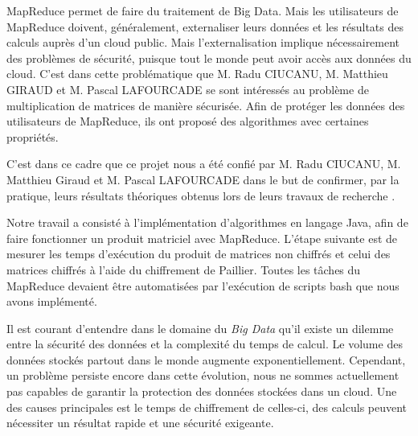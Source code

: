 

MapReduce permet de faire du traitement de Big Data.
Mais les utilisateurs de MapReduce doivent, généralement, externaliser leurs données et les résultats des calculs auprès
d'un cloud public. Mais l'externalisation implique nécessairement des problèmes de sécurité, puisque tout le monde peut avoir accès aux données du cloud. C'est dans cette problématique que M. Radu CIUCANU, M. Matthieu GIRAUD et M. Pascal LAFOURCADE se sont intéressés au problème de multiplication de matrices de manière sécurisée.
Afin de protéger les données des utilisateurs de MapReduce, ils ont proposé des algorithmes avec certaines propriétés.

\bigskip
C'est dans ce cadre que ce projet nous a été confié par M. Radu CIUCANU, M. Matthieu Giraud et 
M. Pascal LAFOURCADE dans le but de confirmer, par la pratique, leurs résultats théoriques obtenus lors de leurs travaux de recherche \cite{publi-tuteur} .

\bigskip
Notre travail a consisté à l'implémentation d'algorithmes en langage Java, afin de faire fonctionner un produit matriciel avec MapReduce. L'étape suivante est de mesurer les temps d'exécution du produit de matrices non chiffrés et celui des matrices chiffrés à l'aide du chiffrement de Paillier. Toutes les tâches du MapReduce devaient être automatisées par l'exécution de scripts bash que nous avons implémenté.

\bigskip
Il est courant d'entendre dans le domaine du \textit{Big Data} qu'il existe un dilemme entre la sécurité des données et la complexité du temps de calcul. Le volume des données stockés partout dans le monde augmente exponentiellement. Cependant, un problème persiste encore dans cette évolution, nous ne sommes actuellement pas capables de garantir la protection des données stockées dans un cloud. Une des causes principales est le temps de chiffrement de celles-ci, des calculs peuvent nécessiter un résultat rapide et une sécurité exigeante.\par


